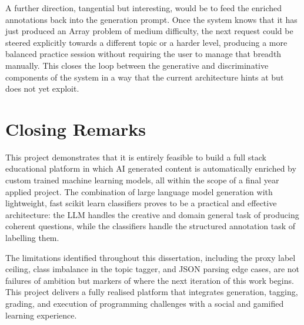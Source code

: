 A further direction, tangential but interesting, would be to feed the
enriched annotations back into the generation prompt. Once the system
knows that it has just produced an Array problem of medium difficulty,
the next request could be steered explicitly towards a different
topic or a harder level, producing a more balanced practice session
without requiring the user to manage that breadth manually. This
closes the loop between the generative and discriminative components
of the system in a way that the current architecture hints at but
does not yet exploit.

\section{Closing Remarks}

This project demonstrates that it is entirely feasible to build a full
stack educational platform in which AI generated content is
automatically enriched by custom trained machine learning models, all
within the scope of a final year applied project. The combination of
large language model generation with lightweight, fast scikit learn
classifiers \cite{pedregosa2011} proves to be a practical and
effective architecture: the LLM handles the creative and domain
general task of producing coherent questions, while the classifiers
handle the structured annotation task of labelling them.

The limitations identified throughout this dissertation, including the proxy label ceiling, class imbalance in the topic tagger, and JSON parsing edge cases, are not failures of ambition but markers of where
the next iteration of this work begins. This project delivers a fully realised platform that integrates generation, tagging, grading, and execution of programming challenges with a social and gamified learning experience.
